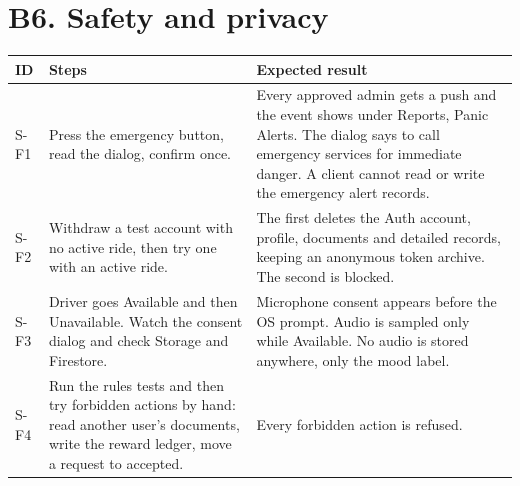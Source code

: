 \section*{B6. Safety and privacy}
\small
\begin{longtable}{|p{1.1cm}|p{6.6cm}|p{6.3cm}|}
\hline
\textbf{ID} & \textbf{Steps} & \textbf{Expected result} \\
\hline
\endhead
S-F1 & Press the emergency button, read the dialog, confirm once. & Every approved admin gets a push and the event shows under Reports, Panic Alerts. The dialog says to call emergency services for immediate danger. A client cannot read or write the emergency alert records. \\
\hline
S-F2 & Withdraw a test account with no active ride, then try one with an active ride. & The first deletes the Auth account, profile, documents and detailed records, keeping an anonymous token archive. The second is blocked. \\
\hline
S-F3 & Driver goes Available and then Unavailable. Watch the consent dialog and check Storage and Firestore. & Microphone consent appears before the OS prompt. Audio is sampled only while Available. No audio is stored anywhere, only the mood label. \\
\hline
S-F4 & Run the rules tests and then try forbidden actions by hand: read another user’s documents, write the reward ledger, move a request to accepted. & Every forbidden action is refused. \\
\hline
\end{longtable}
\normalsize

